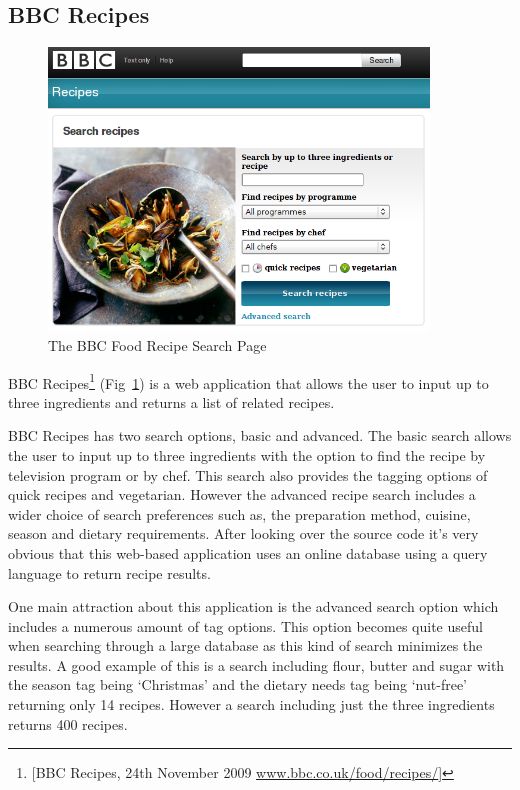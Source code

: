 \subsection{BBC Recipes}

\begin{figure}[h]
\includegraphics[width=0.9\textwidth]{screenshot_bbc_recipes}
\caption{The BBC Food Recipe Search Page}
\label{fig:bbc_food}
\end{figure}


BBC Recipes\footnote{[BBC Recipes, 24th November 2009 \url{www.bbc.co.uk/food/recipes/}]} (Fig~\ref{fig:bbc_food}) is a web application that allows the user to input up to three ingredients and returns a list of related recipes. 

BBC Recipes has two search options, basic and advanced. The basic search allows the user to input up to three ingredients with the option to find the recipe by television program or by chef. This search also provides the tagging options of quick recipes and vegetarian. However the advanced recipe search includes a wider choice of search preferences such as, the preparation method, cuisine, season and dietary requirements. After looking over the source code it’s very obvious that this web-based application uses an online database using a query language to return recipe results. 

One main attraction about this application is the advanced search option which includes a numerous amount of tag options. This option becomes quite useful when searching through a large database as this kind of search minimizes the results. A good example of this is a search including flour, butter and sugar with the season tag being ‘Christmas’ and the dietary needs tag being ‘nut-free’ returning only 14 recipes. However a search including just the three ingredients returns 400 recipes. 

